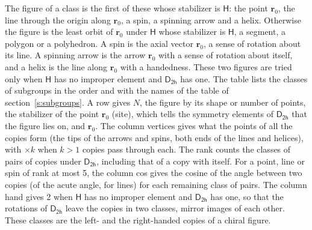 \documentclass[10pt,a4paper]{article}
\numberwithin{equation}{section}
\newcommand{\grp}[1]{\mathsf{#1}}
\newcommand{\pointr}{\mathbf{r}}
\begin{document}
\leavevmode\label{n:head.figure}The figure of a class is the first of these whose stabilizer is $\grp{H}$: the point $\pointr_0$, the line through the origin along $\pointr_0$, a spin, a spinning arrow and a helix. Otherwise the figure is the least orbit of $\pointr_0$ under $\grp{H}$ whose stabilizer is $\grp{H}$, a segment, a polygon or a polyhedron. A spin is the axial vector $\pointr_0$, a sense of rotation about its line. A spinning arrow is the arrow $\pointr_0$ with a sense of rotation about itself, and a helix is the line along $\pointr_0$ with a handedness. These two figures are tried only when $\grp{H}$ has no improper element and $\grp{D_{2h}}$ has one. The table lists the classes of subgroups in the order and with the names of the table of section~\ref{s:subgroups}. \label{n:head.site}A row gives $N$, the figure by its shape or number of points, the stabilizer of the point $\pointr_0$ (site), which tells the symmetry elements of $\grp{D_{2h}}$ that the figure lies on, and $\pointr_0$. \label{n:head.vertices}The column vertices gives what the points of all the copies form (the tips of the arrows and spins, both ends of the lines and helices), with ${\times}k$ when $k > 1$ copies pass through each. \label{n:head.rank}The rank counts the classes of pairs of copies under $\grp{D_{2h}}$, including that of a copy with itself. \label{n:head.cos}For a point, line or spin of rank at most 5, the column cos gives the cosine of the angle between two copies (of the acute angle, for lines) for each remaining class of pairs. \label{n:head.hand}The column hand gives 2 when $\grp{H}$ has no improper element and $\grp{D_{2h}}$ has one, so that the rotations of $\grp{D_{2h}}$ leave the copies in two classes, mirror images of each other. These classes are the left- and the right-handed copies of a chiral figure.
\end{document}
